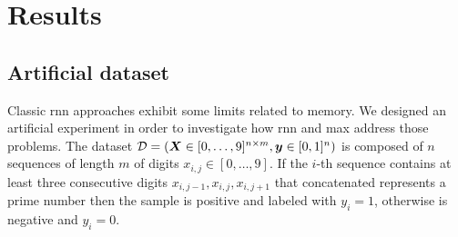 

\section{Results}
\subsection{Artificial dataset}\label{sec:experiments}
Classic \ac{rnn} approaches exhibit some limits related to
memory. We designed an artificial experiment in
order to investigate how \ac{rnn} and \ac{max} address those
problems. The dataset 
$\mathcal{D}=(\bm{X}\in [0,\dots,9]^{n\times m},\bm{y}\in [0,1]^n)$ is
composed of $n$ sequences of length
$m$ of digits $x_{i,j}\in[0,\dots,9]$. If the $i$-th sequence contains
at least three consecutive digits
$x_{i,j-1},x_{i,j},x_{i,j+1}$ that concatenated represents a prime
number then the
sample is positive and labeled with $y_i=1$, otherwise is negative and
$y_i=0$.

